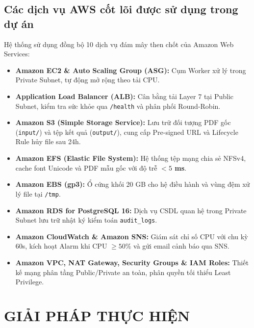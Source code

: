\documentclass[12pt,a4paper]{report}
\begin{document}
\section{Các dịch vụ AWS cốt lõi được sử dụng trong dự án}
Hệ thống sử dụng đồng bộ 10 dịch vụ đám mây then chốt của Amazon Web Services:
\begin{itemize}
    \item \textbf{Amazon EC2 \& Auto Scaling Group (ASG):} Cụm Worker xử lý trong Private Subnet, tự động mở rộng theo tải CPU.
    \item \textbf{Application Load Balancer (ALB):} Cân bằng tải Layer 7 tại Public Subnet, kiểm tra sức khỏe qua \texttt{/health} và phân phối Round-Robin.
    \item \textbf{Amazon S3 (Simple Storage Service):} Lưu trữ đối tượng PDF gốc (\texttt{input/}) và tệp kết quả (\texttt{output/}), cung cấp Pre-signed URL và Lifecycle Rule hủy file sau 24h.
    \item \textbf{Amazon EFS (Elastic File System):} Hệ thống tệp mạng chia sẻ NFSv4, cache font Unicode và PDF mẫu gốc với độ trễ \textbf{$< 5$ ms}.
    \item \textbf{Amazon EBS (gp3):} Ổ cứng khối 20 GB cho hệ điều hành và vùng đệm xử lý file tại \texttt{/tmp}.
    \item \textbf{Amazon RDS for PostgreSQL 16:} Dịch vụ CSDL quan hệ trong Private Subnet lưu trữ nhật ký kiểm toán \texttt{audit\_logs}.
    \item \textbf{Amazon CloudWatch \& Amazon SNS:} Giám sát chỉ số CPU với chu kỳ 60s, kích hoạt Alarm khi CPU $\ge 50\%$ và gửi email cảnh báo qua SNS.
    \item \textbf{Amazon VPC, NAT Gateway, Security Groups \& IAM Roles:} Thiết kế mạng phân tầng Public/Private an toàn, phân quyền tối thiểu Least Privilege.
\end{itemize}

\chapter{GIẢI PHÁP THỰC HIỆN}
\end{document}
